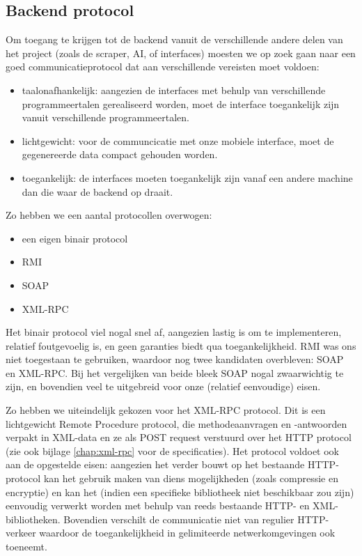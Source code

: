 \subsection{Backend protocol}

Om toegang te krijgen tot de backend vanuit de verschillende andere delen van het project (zoals de scraper, AI, of interfaces) moesten we op zoek gaan naar een goed communicatieprotocol dat aan verschillende vereisten moet voldoen:
\begin{itemize}
\item{taalonafhankelijk: aangezien de interfaces met behulp van verschillende programmeertalen gerealiseerd worden, moet de interface toegankelijk zijn vanuit verschillende programmeertalen.}
\item{lichtgewicht: voor de communcicatie met onze mobiele interface, moet de gegenereerde data compact gehouden worden.}
\item{toegankelijk: de interfaces moeten toegankelijk zijn vanaf een andere machine dan die waar de backend op draait.}
\end{itemize}

Zo hebben we een aantal protocollen overwogen:
\begin{itemize}
\item{een eigen binair protocol}
\item{RMI}
\item{SOAP}
\item{XML-RPC}
\end{itemize}

Het binair protocol viel nogal snel af, aangezien lastig is om te implementeren, relatief foutgevoelig is, en geen garanties biedt qua toegankelijkheid. RMI was ons niet toegestaan te gebruiken, waardoor nog twee kandidaten overbleven: SOAP en XML-RPC. Bij het vergelijken van beide bleek SOAP nogal zwaarwichtig te zijn, en bovendien veel te uitgebreid voor onze (relatief eenvoudige) eisen.

Zo hebben we uiteindelijk gekozen voor het XML-RPC protocol. Dit is een lichtgewicht Remote Procedure protocol, die methodeaanvragen en -antwoorden verpakt in XML-data en ze als POST request verstuurd over het HTTP protocol (zie ook bijlage \ref{chap:xml-rpc} voor de specificaties).
Het protocol voldoet ook aan de opgestelde eisen: aangezien het verder bouwt op het bestaande HTTP-protocol kan het gebruik maken van diens mogelijkheden (zoals compressie en encryptie) en kan het (indien een specifieke bibliotheek niet beschikbaar zou zijn) eenvoudig verwerkt worden met behulp van reeds bestaande HTTP- en XML-bibliotheken. Bovendien verschilt de communicatie niet van regulier HTTP-verkeer waardoor de toegankelijkheid in gelimiteerde netwerkomgevingen ook toeneemt.

